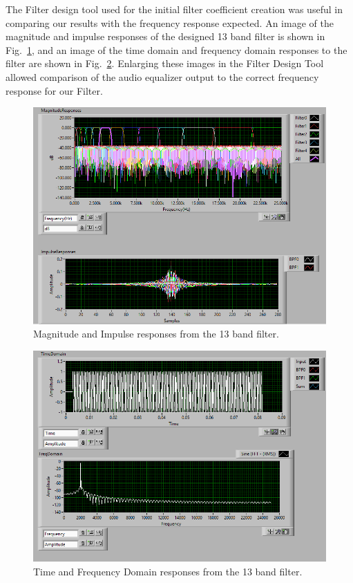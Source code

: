 \documentclass[journal]{IEEEtran} %
\begin{document}
The Filter design tool used for the initial filter coefficient creation was useful in comparing our results with the frequency response expected. An image of the magnitude and impulse responses of the designed 13 band filter is shown in Fig.~\ref{fig:magnitude}, and an image of the time domain and frequency domain responses to the filter are shown in Fig.~\ref{fig:domains}. Enlarging these images in the Filter Design Tool allowed comparison of the audio equalizer output to the correct frequency response for our Filter.

\begin{figure}[htbp]
\centering
\includegraphics[width=0.9\linewidth]{Figures/EQ/magnitude.png}
\caption{\label{fig:magnitude}Magnitude and Impulse responses from the 13 band filter.}
\end{figure}

\begin{figure}[htbp]
\centering
\includegraphics[width=0.9\linewidth]{Figures/EQ/freq_domain.png}
\caption{\label{fig:domains}Time and Frequency Domain responses from the 13 band filter.}
\end{figure}
\end{document}
